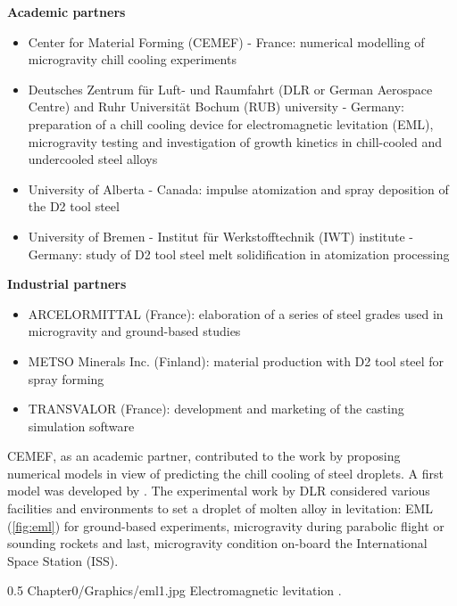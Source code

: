\textbf{Academic partners} 
 \begin{itemize}
\itemsep0em
\item Center for Material Forming (CEMEF) - France: numerical modelling of microgravity chill cooling experiments
\item Deutsches Zentrum für Luft- und Raumfahrt (DLR or German Aerospace Centre) and Ruhr Universität Bochum (RUB) university - Germany:  preparation of a chill cooling device 
for electromagnetic levitation (EML), microgravity testing and investigation of growth kinetics 
in chill-cooled and undercooled steel alloys
\item University of Alberta - Canada: impulse atomization and spray deposition of the D2 tool steel 
\item University of Bremen - Institut für Werkstofftechnik (IWT) institute - Germany: 
study of D2 tool steel melt solidification in atomization processing
\end{itemize}

\textbf{Industrial partners}
\begin{itemize}
\itemsep0em
\item ARCELORMITTAL (France): elaboration of a series of steel grades used in microgravity and ground-based studies
\item METSO Minerals Inc.  (Finland): material production with D2 tool steel for spray forming
\item TRANSVALOR (France): development and marketing of the casting simulation software \thercast
\end{itemize}

CEMEF, as an academic partner, contributed to the work by proposing numerical models in view of predicting the chill cooling of steel droplets. 
A first model was developed by \citet{rivaux_simulation_2011}. 
The experimental work by DLR considered various facilities and environments to set a droplet of molten alloy in levitation: 
EML (\cref{fig:eml}) for ground-based experiments, 
microgravity during parabolic flight or sounding rockets and last, microgravity condition on-board the International Space Station (ISS).
\begin{figureth}
{0.5}
{Chapter0/Graphics/eml1.jpg}
{Electromagnetic levitation \citep{dlr_electomagnetic_2014}.}
\label{fig:eml}
\end{figureth}
%
